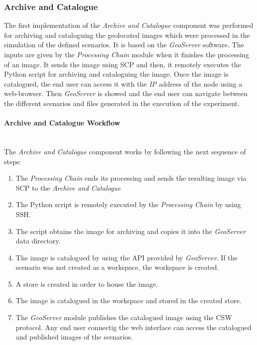 \subsubsection{Archive and Catalogue}

The first implementation of the \emph{Archive and Catalogue} component was
performed for archiving and cataloguing the geolocated images which were
processed in the simulation of the defined scenarios. It is based on the
\emph{GeoServer} software. The inputs are given by the \emph {Processing Chain}
module when it finishes the processing of an image. It sends the image using
\ac{SCP} and then, it remotely executes the Python script for archiving and
cataloguing the image. Once the image is catalogued, the end user can access it
with the \emph{IP} address of the node using a web-browser. Then
\emph{GeoServer} is showed and the end user can navigate between the different
scenarios and files generated in the execution of the experiment.

\paragraph{Archive and Catalogue Workflow}~\\

The \emph{Archive and Catalogue} component works by following the next sequence
of steps:
\begin{enumerate}
\item The \emph{Processing Chain} ends its processing and sends the resulting
  image via \ac{SCP} to the \emph{Archive and Catalogue} 
\item The Python script is remotely executed by the \emph{Processing Chain}
  by using \ac{SSH}.
\item The script obtains the image for archiving and copies it into the
  \emph{GeoServer} data directory.
\item The image is catalogued by using the \ac{API} provided by
  \emph{GeoServer}. If the scenario was not created as a workspace, the
  workspace is created.
  \item A store is created in order to house the image.
  \item The image is catalogued in the workspace and stored in the created store.
  \item The \emph{GeoServer} module publishes the catalogued image using the
  \ac{CSW} protocol. Any end user connectig the web interface can access the
  catalogued and published images of the scenarios.
\end{enumerate}


